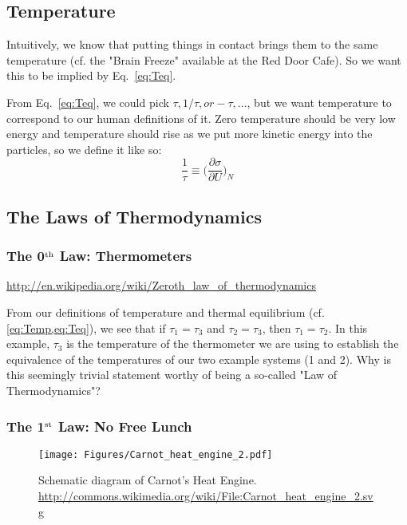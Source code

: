 \subsection{Temperature}
\label{s:Temperature}

Intuitively, we know that putting things in contact brings them to the same temperature
(cf. the "Brain Freeze" available at the Red Door Cafe). So we want this to be
implied by Eq.~\ref{eq:Teq}.

From Eq.~\ref{eq:Teq}, we could pick $\tau, 1/\tau, or -\tau,...$, but we want temperature
to correspond to our human definitions of it. Zero temperature should be very low energy
and temperature should rise as we put more kinetic energy into the particles, so we define
it like so:
\begin{equation}
\frac{1}{\tau} \equiv \bigg(\frac{\partial \sigma}{\partial U}\bigg)_{N}
\label{eq:Temp}
\end{equation}

\subsection{The Laws of Thermodynamics}

\subsubsection{The 0$^{\rm th}$ Law: Thermometers}
\url{http://en.wikipedia.org/wiki/Zeroth_law_of_thermodynamics}

From our definitions of temperature and thermal equilibrium 
(cf. \cref{eq:Temp,eq:Teq}), 
we see that if $\tau_1 = \tau_3$ and $\tau_2 = \tau_3$, then 
$\tau_1 = \tau_2$. 
In this example, $\tau_3$ is the temperature of the thermometer we are 
using to establish the equivalence of the temperatures of our two example 
systems (1 and 2). Why is this seemingly trivial statement worthy
of being a so-called "Law of Thermodynamics"? 



\subsubsection{The 1$^{\rm st}$ Law: No Free Lunch}
\begin{figure}[h]
\centering
\texttt{[image: Figures/Carnot\_heat\_engine\_2.pdf]}
\caption{Schematic diagram of Carnot's Heat Engine. \\
	\url{http://commons.wikimedia.org/wiki/File:Carnot_heat_engine_2.svg}}
\end{figure}

